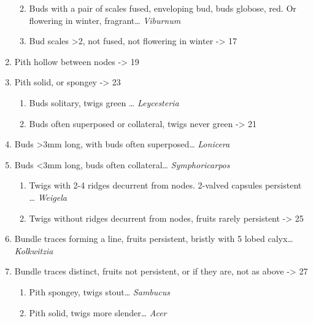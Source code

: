 \documentclass[openany]{book}
\providecommand{\tightlist}{%
  \setlength{\itemsep}{0pt}\setlength{\parskip}{0pt}}
\begin{document}
\begin{enumerate}
  \begin{enumerate}
  \def\labelenumii{\arabic{enumii}.}
  \setcounter{enumii}{14}
  \tightlist
  \item
    Buds with a pair of scales fused, enveloping bud, buds globose, red. Or flowering in winter, fragrant\ldots{} \emph{Viburnum}
  \item
    Bud scales \textgreater{}2, not fused, not flowering in winter -\textgreater{} 17
  \end{enumerate}
\item
  Pith hollow between nodes -\textgreater{} 19
\item
  Pith solid, or spongey -\textgreater{} 23

  \begin{enumerate}
  \def\labelenumii{\arabic{enumii}.}
  \setcounter{enumii}{18}
  \tightlist
  \item
    Buds solitary, twigs green \ldots{} \emph{Leycesteria}
  \item
    Buds often superposed or collateral, twigs never green -\textgreater{} 21
  \end{enumerate}
\item
  Buds \textgreater{}3mm long, with buds often superposed\ldots{} \emph{Lonicera}
\item
  Buds \textless{}3mm long, buds often collateral\ldots{} \emph{Symphoricarpos}

  \begin{enumerate}
  \def\labelenumii{\arabic{enumii}.}
  \setcounter{enumii}{22}
  \tightlist
  \item
    Twigs with 2-4 ridges decurrent from nodes. 2-valved capsules persistent \ldots{} \emph{Weigela}
  \item
    Twigs without ridges decurrent from nodes, fruits rarely persistent -\textgreater{} 25
  \end{enumerate}
\item
  Bundle traces forming a line, fruits persistent, bristly with 5 lobed calyx\ldots{}\emph{Kolkwitzia}
\item
  Bundle traces distinct, fruits not persistent, or if they are, not as above -\textgreater{} 27

  \begin{enumerate}
  \def\labelenumii{\arabic{enumii}.}
  \setcounter{enumii}{26}
  \tightlist
  \item
    Pith spongey, twigs stout\ldots{} \emph{Sambucus}
  \item
    Pith solid, twigs more slender\ldots{} \emph{Acer}
  \end{enumerate}
\end{enumerate}
\end{document}
